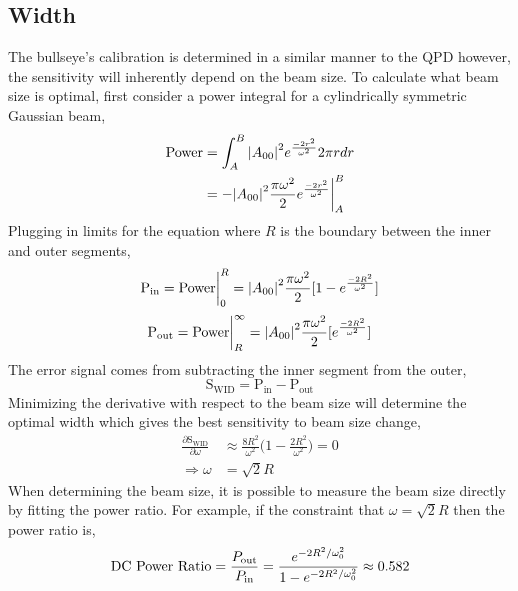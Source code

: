 \begin{appendices}
	\subsection{Width}
	 The bullseye's calibration is determined in a similar manner to the QPD however, the sensitivity will inherently depend on the beam size. To calculate what beam size is optimal, first consider a power integral for a cylindrically symmetric Gaussian beam,
	\begin{equation}
	\begin{split}
	\text{Power} &= \int_{A}^{B} \abs{A_{00}}^2e^{\frac{-2r^2}{\omega^2}} 2\pi r dr\\
			&= -\abs{A_{00}}^2 \frac{\pi \omega^2}{2} e^{\frac{-2r^2}{\omega^2}} \biggr\rvert_A^B
	\end{split}
	\end{equation}
	Plugging in limits for the equation where $R$ is the boundary between the inner and outer segments,
	\begin{equation}
	\text{P}_{\text{in}} = \text{Power} \biggr\rvert_0^{R} = \abs{A_{00}}^2 \frac{\pi \omega^2}{2} [1 - e^{\frac{-2R^2}{\omega^2}}]
	\end{equation}
	\begin{equation}
	\text{P}_{\text{out}} = \text{Power} \biggr\rvert_{R}^{\infty} = \abs{A_{00}}^2 \frac{\pi \omega^2}{2} [e^{\frac{-2R^2}{\omega^2}}]
	\end{equation}
	The error signal comes from subtracting the inner segment from the outer,
	\begin{equation}
	\text{S}_{\text{WID}} =  \text{P}_{\text{in}} - \text{P}_{\text{out}}
	\end{equation}
	Minimizing the derivative with respect to the beam size will determine the optimal width which gives the best sensitivity to beam size change,
	\begin{equation}
	\begin{aligned}
	\frac{\partial \text{S}_{\text{WID}}}{\partial \omega} &\approx \frac{8 R^2}{\omega^2} \bigg(1-\frac{2 R^2}{\omega^2}\bigg) = 0 \\
	\Rightarrow	\omega &= \sqrt{2} R
	\end{aligned}
	\end{equation}
	When determining the beam size, it is possible to measure the beam size directly by fitting the power ratio. For example, if the constraint that $\omega = \sqrt{2} R$ then the power ratio is,
	\begin{equation}
	\text{DC Power Ratio} 
	= \frac{P_{\text{out}}}{P_{\text{in}}} \\
	= \frac{e^{-2R^2/ \omega_{0}^2}} {1 - e^{-2R^2/ \omega_{0}^2 }} \approx 0.582
	\end{equation}


\end{appendices}
